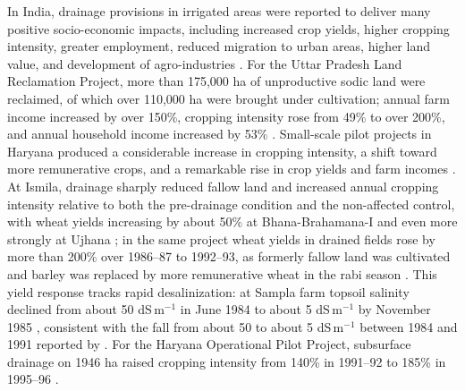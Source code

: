 In India, drainage provisions in irrigated areas were reported to deliver many positive socio-economic impacts, including increased crop yields, higher cropping intensity, greater employment, reduced migration to urban areas, higher land value, and development of agro-industries \parencite{Gopalakrishnan2007}. For the Uttar Pradesh Land Reclamation Project, more than 175{,}000 ha of unproductive sodic land were reclaimed, of which over 110{,}000 ha were brought under cultivation; annual farm income increased by over 150\%, cropping intensity rose from 49\% to over 200\%, and annual household income increased by 53\% \parencite{Gopalakrishnan2007}. Small-scale pilot projects in Haryana produced a considerable increase in cropping intensity, a shift toward more remunerative crops, and a remarkable rise in crop yields and farm incomes \parencite{Datta2002}. At Ismila, drainage sharply reduced fallow land and increased annual cropping intensity relative to both the pre-drainage condition and the non-affected control, with wheat yields increasing by about 50\% at Bhana-Brahamana-I and even more strongly at Ujhana \parencite{Datta2002}; in the same project wheat yields in drained fields rose by more than 200\% over 1986--87 to 1992--93, as formerly fallow land was cultivated and barley was replaced by more remunerative wheat in the rabi season \parencite{Datta2000}. This yield response tracks rapid desalinization: at Sampla farm topsoil salinity declined from about 50 dS\,m$^{-1}$ in June 1984 to about 5 dS\,m$^{-1}$ by November 1985 \parencite{Datta2002}, consistent with the fall from about 50 to about 5 dS\,m$^{-1}$ between 1984 and 1991 reported by \textcite{Datta2000}. For the Haryana Operational Pilot Project, subsurface drainage on 1946 ha raised cropping intensity from 140\% in 1991--92 to 185\% in 1995--96 \parencite{Gopalakrishnan2007}.

